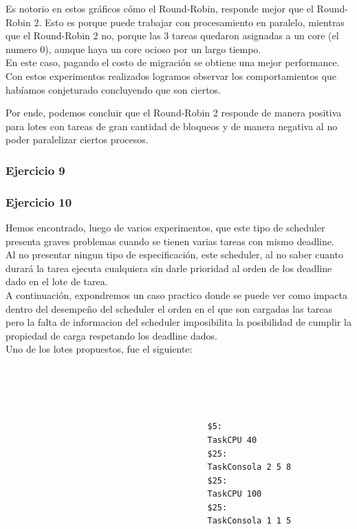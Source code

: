  \indent Es notorio en estos gráficos cómo el Round-Robin, responde mejor que el Round-Robin 2. 
 Esto es porque puede trabajar con procesamiento en paralelo, mientras que el Round-Robin 2 no, 
 porque las 3 tareas quedaron asignadas a un core (el numero 0), aunque haya un core ocioso por un largo tiempo.\\
 En este caso, pagando el costo de migración se obtiene una mejor performance.\\

\indent Con estos experimentos realizados logramos observar los comportamientos que habíamos conjeturado concluyendo que son
ciertos. 

\indent Por ende, podemos concluir que el Round-Robin 2 responde de manera positiva para lotes con tareas de gran cantidad de bloqueos
y de manera negativa al no poder paralelizar ciertos procesos.\\
  
\subsubsection[Resolución Ejercicio 9]{Ejercicio 9}

\subsubsection[Resolución Ejercicio 10]{Ejercicio 10}

\indent Hemos encontrado, luego de varios experimentos, que este tipo de scheduler presenta graves problemas cuando 
se tienen varias tareas con mismo deadline.\\
Al no presentar ningun tipo de especificación, este scheduler, al no saber cuanto durará la tarea ejecuta cualquiera sin
darle prioridad al orden de los deadline dado en el lote de tarea.\\
A continuación, expondremos un caso practico donde se puede ver como impacta dentro del desempeño del scheduler el orden en el que son
cargadas las tareas pero la falta de informacion del scheduler imposibilita la posibilidad de cumplir la propiedad
de carga respetando los deadline dados.\\

Uno de los lotes propuestos, fue el siguiente:\\
\\\\\\\\
\begin{verbatim}
                                         $5:
                                         TaskCPU 40
                                         $25:
                                         TaskConsola 2 5 8
                                         $25:
                                         TaskCPU 100
                                         $25:
                                         TaskConsola 1 1 5

\end{verbatim}

